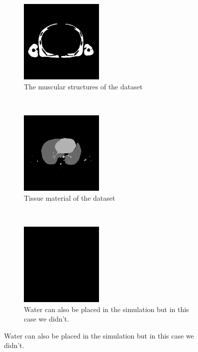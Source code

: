 \begin{figure}[h]
	\begin{subfigure}[h]{0.3\textwidth}
		\centering
		\includegraphics[height=4cm]{images/KoreanMuscle.png}
		\caption{The muscular structures of the dataset\\}
		\label{korean4}
	\end{subfigure}%
	~
	\begin{subfigure}[h]{0.3\textwidth}
		\centering
		\includegraphics[height=4cm]{images/KoreanTissue.png}
		\caption{Tissue material of the dataset\\}
		\label{korean5}
	\end{subfigure}%
	~
	\begin{subfigure}[h]{0.3\textwidth}
		\centering
		\includegraphics[height=4cm]{images/KoreanWater.png}
		\caption{Water can also be placed in the simulation but in this case we didn't.}
		\label{korean6}
	\end{subfigure}%
\end{figure}
